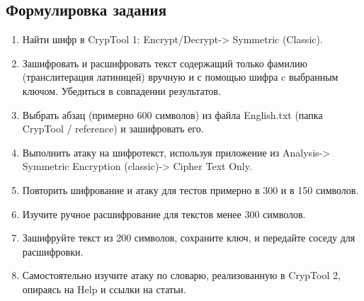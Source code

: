 \documentclass[a4paper, 14pt]{extarticle}
\begin{document}
\subsection{Формулировка задания}
\begin{enumerate}
    \item Найти шифр в CrypTool 1: Encrypt/Decrypt-> Symmetric (Classic).
    \item Зашифровать и расшифровать текст содержащий только фамилию (транслитерация латиницей) вручную и с помощью шифра c выбранным ключом. Убедиться в совпадении результатов.
    \item Выбрать абзац (примерно 600 символов) из файла English.txt (папка CrypTool / reference) и зашифровать его.
    \item Выполнить атаку на шифротекст, используя приложение из Analysis-> Symmetric Encryption (classic)-> Cipher Text Only.
    \item Повторить шифрование и атаку для тестов примерно в 300 и в 150 символов.
    \item Изучите ручное расшифрование для текстов менее 300 символов.
    \item Зашифруйте текст из 200 символов, сохраните ключ, и передайте соседу для расшифровки.
    \item Самостоятельно изучите атаку по словарю, реализованную в CrypTool 2, опираясь на Help и ссылки на статьи.
\end{enumerate}
\end{document}
